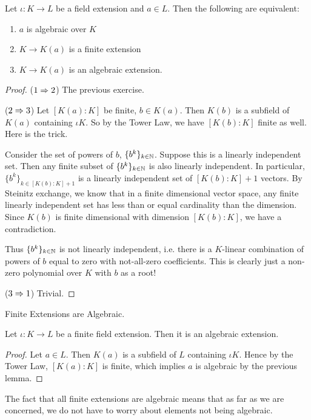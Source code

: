 \documentclass[../book.tex]{subfiles}
\begin{document}
\begin{lem}
    Let $\iota : K \to L$ be a field extension and $a \in L$. 
    Then the following are equivalent:
    \begin{enumerate}
        \item $a$ is algebraic over $K$
        \item $K \to K(a)$ is a finite extension
        \item $K \to K(a)$ is an algebraic extension.
    \end{enumerate}
\end{lem}
\begin{proof}
    ($1 \Rightarrow 2$)
        The previous exercise.
        
    ($2 \Rightarrow 3$)
        Let $[K(a):K]$ be finite, $b \in K(a)$.
        Then $K(b)$ is a subfield of $K(a)$ containing $\iota K$. 
        So by the Tower Law, we have $[K(b):K]$ finite as well.
        Here is the trick. 
        
        Consider the set of powers of $b$, $\{b^k\}_{k\in\mathbb{N}}$.
        Suppose this is a linearly independent set.
        Then any finite subset of $\{b^k\}_{k\in\mathbb{N}}$ is also linearly independent.
        In particular, $\{b^k\}_{k\in[K(b):K]+1}$ is a linearly independent set
        of $[K(b):K]+1$ vectors.
        By Steinitz exchange, we know that in a finite dimensional vector space, 
        any finite linearly independent set has less than or equal cardinality
        than the dimension. 
        Since $K(b)$ is finite dimensional with dimension $[K(b):K]$,
        we have a contradiction.
        
        Thus $\{b^k\}_{k\in\mathbb{N}}$ is not linearly independent, i.e.
        there is a $K$-linear combination of powers of $b$ equal to zero
        with not-all-zero coefficients.
        This is clearly just a non-zero polynomial over $K$ 
        with $b$ as a root!
        
    ($3 \Rightarrow 1$)
        Trivial.
\end{proof}
\begin{thm} Finite Extensions are Algebraic.

    Let $\iota : K \to L$ be a finite field extension. 
    Then it is an algebraic extension.
\end{thm}
\begin{proof}
    Let $a \in L$. Then $K(a)$ is a subfield of $L$ containing $\iota K$.
    Hence by the Tower Law, $[K(a) : K]$ is finite,
    which implies $a$ is algebraic by the previous lemma. 
\end{proof}
\begin{rmk}
    The fact that all finite extensions are algebraic means that
    as far as we are concerned, we do not have to worry about
    elements not being algebraic.
\end{rmk}
\end{document}
